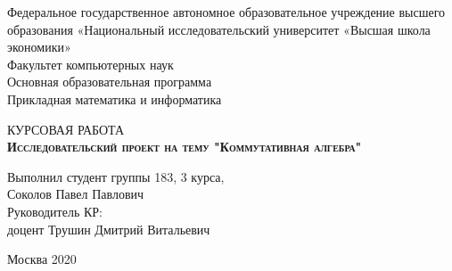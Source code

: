 \begin{titlepage}
\newpage

{
\begin{center}
Федеральное государственное автономное образовательное учреждение высшего образования «Национальный исследовательский университет «Высшая школа экономики»
\\
\bigskip
Факультет компьютерных наук \\
Основная образовательная программа \\
Прикладная математика и информатика \\
\end{center}
}

\vspace{8em}

\begin{center}
{\Large КУРСОВАЯ РАБОТА}\\
\textsc{\textbf{
Исследовательский проект на тему
\linebreak
"Коммутативная алгебра"}}
\end{center}

\vspace{2em}

{
\hfill\parbox{16cm}{
\hspace*{5cm}\hspace*{-5cm}Выполнил студент группы 183, 3 курса,\\
 Соколов Павел Павлович\\

\hspace*{5cm}\hspace*{-5cm}Руководитель КР:\\
доцент Трушин Дмитрий Витальевич\\


}
}

\vspace{\fill}

\begin{center}
Москва 2020
\end{center}

\end{titlepage}
